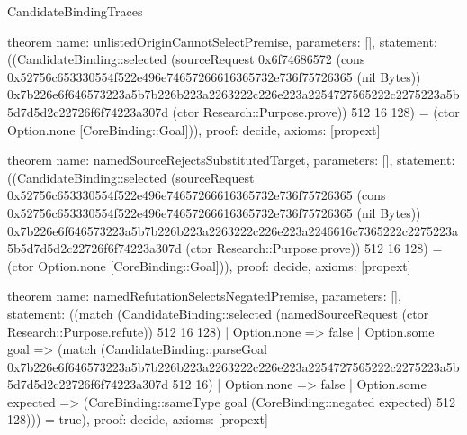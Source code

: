 \begin{lexlean}{CandidateBindingTraces}
\begin{semanticmodule}
theorem{
 name: unlistedOriginCannotSelectPremise,
 parameters: [],
 statement: ((CandidateBinding::selected (sourceRequest 0x6f74686572 (cons 0x52756c653330554f522e496e74657266616365732e736f75726365 (nil Bytes)) 0x7b226e6f646573223a5b7b226b223a2263222c226e223a2254727565222c2275223a5b5d7d5d2c22726f6f74223a307d (ctor Research::Purpose.prove)) 512 16 128) = (ctor Option.none [CoreBinding::Goal])),
 proof: decide{},
 axioms: [propext]
}

theorem{
 name: namedSourceRejectsSubstitutedTarget,
 parameters: [],
 statement: ((CandidateBinding::selected (sourceRequest 0x52756c653330554f522e496e74657266616365732e736f75726365 (cons 0x52756c653330554f522e496e74657266616365732e736f75726365 (nil Bytes)) 0x7b226e6f646573223a5b7b226b223a2263222c226e223a2246616c7365222c2275223a5b5d7d5d2c22726f6f74223a307d (ctor Research::Purpose.prove)) 512 16 128) = (ctor Option.none [CoreBinding::Goal])),
 proof: decide{},
 axioms: [propext]
}

theorem{
 name: namedRefutationSelectsNegatedPremise,
 parameters: [],
 statement: ((match (CandidateBinding::selected (namedSourceRequest (ctor Research::Purpose.refute)) 512 16 128) | Option.none => false | Option.some goal => (match (CandidateBinding::parseGoal 0x7b226e6f646573223a5b7b226b223a2263222c226e223a2254727565222c2275223a5b5d7d5d2c22726f6f74223a307d 512 16) | Option.none => false | Option.some expected => (CoreBinding::sameType goal (CoreBinding::negated expected) 512 128))) = true),
 proof: decide{},
 axioms: [propext]
}
\end{semanticmodule}
\end{lexlean}
